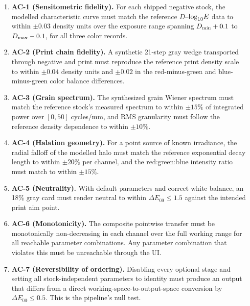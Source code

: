 \begin{enumerate}
\item \textbf{AC-1 (Sensitometric fidelity).} For each shipped negative stock,
the modelled characteristic curve must match the reference $D$--$\log_{10}\!E$ data to
within $\pm 0.03$ density units over the exposure range spanning $D_{\min} + 0.1$
to $D_{\max} - 0.1$, for all three color records.
\item \textbf{AC-2 (Print chain fidelity).} A synthetic 21-step gray wedge
transported through negative and print must reproduce the reference print
density scale to within $\pm 0.04$ density units and $\pm 0.02$ in the
red-minus-green and blue-minus-green color balance differences.
\item \textbf{AC-3 (Grain spectrum).} The synthesized grain Wiener spectrum
must match the reference stock's measured spectrum to within $\pm 15\%$ of
integrated power over $[0, 50]$ cycles/mm, and RMS granularity must follow the
reference density dependence to within $\pm 10\%$.
\item \textbf{AC-4 (Halation geometry).} For a point source of known
irradiance, the radial falloff of the modelled halo must match the reference
exponential decay length to within $\pm 20\%$ per channel, and the
red:green:blue intensity ratio must match to within $\pm 15\%$.
\item \textbf{AC-5 (Neutrality).} With default parameters and correct white
balance, an 18\% gray card must render neutral to within $\Delta E_{00} \leq
1.5$ against the intended print aim point.
\item \textbf{AC-6 (Monotonicity).} The composite pointwise transfer must be
monotonically non-decreasing in each channel over the full working range for
all reachable parameter combinations. Any parameter combination that violates
this must be unreachable through the UI.
\item \textbf{AC-7 (Reversibility of ordering).} Disabling every optional
stage and setting all stock-independent parameters to identity must produce an
output that differs from a direct working-space-to-output-space conversion by
$\Delta E_{00} \leq 0.5$. This is the pipeline's null test.
\end{enumerate}
